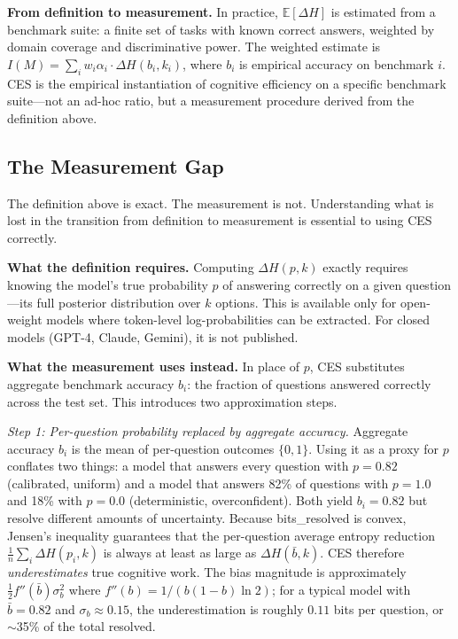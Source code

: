 \documentclass[12pt]{article}
\begin{document}
\textbf{From definition to measurement.} In practice, $\mathbb{E}[\Delta H]$ is estimated from a benchmark suite: a finite set of tasks with known correct answers, weighted by domain coverage and discriminative power. The weighted estimate is $I(M) = \sum_i w_i \alpha_i \cdot \Delta H(b_i, k_i)$, where $b_i$ is empirical accuracy on benchmark $i$. CES is the empirical instantiation of cognitive efficiency on a specific benchmark suite---not an ad-hoc ratio, but a measurement procedure derived from the definition above.

\subsection{The Measurement Gap}

The definition above is exact. The measurement is not. Understanding what is lost in the transition from definition to measurement is essential to using CES correctly.

\textbf{What the definition requires.} Computing $\Delta H(p, k)$ exactly requires knowing the model's true probability $p$ of answering correctly on a given question---its full posterior distribution over $k$ options. This is available only for open-weight models where token-level log-probabilities can be extracted. For closed models (GPT-4, Claude, Gemini), it is not published.

\textbf{What the measurement uses instead.} In place of $p$, CES substitutes aggregate benchmark accuracy $b_i$: the fraction of questions answered correctly across the test set. This introduces two approximation steps.

\textit{Step 1: Per-question probability replaced by aggregate accuracy.} Aggregate accuracy $b_i$ is the mean of per-question outcomes $\{0, 1\}$. Using it as a proxy for $p$ conflates two things: a model that answers every question with $p = 0.82$ (calibrated, uniform) and a model that answers 82\% of questions with $p = 1.0$ and 18\% with $p = 0.0$ (deterministic, overconfident). Both yield $b_i = 0.82$ but resolve different amounts of uncertainty. Because bits\_resolved is convex, Jensen's inequality guarantees that the per-question average entropy reduction $\frac{1}{n}\sum_i \Delta H(p_i, k)$ is always at least as large as $\Delta H(\bar{b}, k)$. CES therefore \textit{underestimates} true cognitive work. The bias magnitude is approximately $\frac{1}{2} f''(\bar{b}) \sigma_b^2$ where $f''(b) = 1/(b(1-b)\ln 2)$; for a typical model with $\bar{b} = 0.82$ and $\sigma_b \approx 0.15$, the underestimation is roughly $0.11$ bits per question, or $\sim$35\% of the total resolved.
\end{document}
